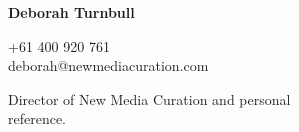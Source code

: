 \documentclass[a4paper,12pt]{article}
\begin{document}
\begin{spacing}{0.95}
\begin{minipage}[t]{45mm}
{		\vspace{-5mm}%
	}%
\end{minipage}%
\hspace{5mm}%
\begin{minipage}[t]{45mm}
	{\small%
		\textbf{\textsf{Deborah Turnbull}}\\
		\vspace{-4mm}\begin{spacing}{0.7}{\footnotesize{\condensed +61 400 920 761\\deborah@newmediacuration.com}}\\\end{spacing}
		\vspace{-1mm}\begin{spacing}{0.9}{\raggedright Director of New Media Curation and personal\\reference.}\end{spacing}%
	\vspace{-5mm}%
	}%
\end{minipage}%
\end{spacing}%
\end{document}
